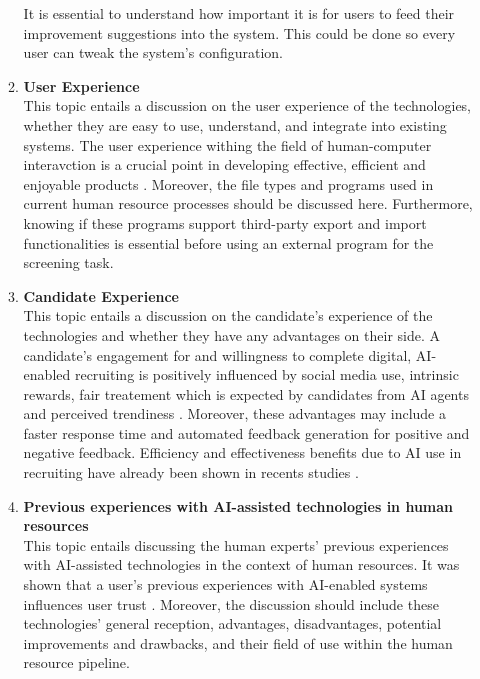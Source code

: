\documentclass[draft,final]{thesisclass} %
\begin{document}
\begin{enumerate}
\begin{enumerate}
        It is essential to understand how important it is for users to feed their improvement suggestions into the system.
        This could be done so every user can tweak the system's configuration.
        \item \textbf{User Experience} \parencite{ux_ml_relationship}\\
        This topic entails a discussion on the user experience of the technologies, whether they are easy to use, understand, and integrate into existing systems.
        The user experience  withing the field of human-computer interavction is a crucial point in developing effective, efficient and enjoyable products \parencite[1]{ux_ml_relationship}.
        Moreover, the file types and programs used in current human resource processes should be discussed here.
        Furthermore, knowing if these programs support third-party export and import functionalities is essential before using an external program for the screening task.
        \item \textbf{Candidate Experience} \parencite{cx_ai_recruiting}\\
        This topic entails a discussion on the candidate's experience of the technologies and whether they have any advantages on their side.
        A candidate's engagement for and willingness to complete digital, \acs{AI}-enabled recruiting is positively influenced by social media use, intrinsic rewards, fair treatement which is expected by candidates from \acs{AI} agents and perceived trendiness \parencite[1,7]{cx_ai_recruiting}.
        Moreover, these advantages may include a faster response time and automated feedback generation for positive and negative feedback.
        Efficiency and effectiveness benefits due to \acs{AI} use in recruiting have already been shown in recents studies \parencite[10]{cx_ai_recruiting}.
        \item \textbf{Previous experiences with \acs{AI}-assisted technologies in human resources} \parencite{previous_experience_user_trust}\\
        This topic entails discussing the human experts' previous experiences with \acs{AI}-assisted technologies in the context of human resources.
        It was shown that a user's previous experiences with \acs{AI}-enabled systems influences user trust \parencite[1256]{previous_experience_user_trust}.
        Moreover, the discussion should include these technologies' general reception, advantages, disadvantages, potential improvements and drawbacks, and their field of use within the human resource pipeline.

\end{enumerate}
\end{enumerate}
\end{document}
